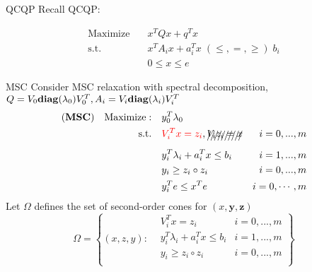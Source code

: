 

\usepackage{subfig}
\usepackage[style=authoryear]{biblatex}
\usepackage{bm}

\date{\today}




\fontsize{9pt}{11}\selectfont
\frame{\titlepage}
\begin{frame}{QCQP}
  Recall QCQP:

  \begin{equation}
    \begin{aligned}
      \mathrm{Maximize}\quad & x^TQx + q^T x                                   \\
      \mathrm{s.t.}  \quad   & x^{T} A_i x  + a_i^Tx   \; (\le, =, \ge) \; b_i \\
                             & 0\le x\le e
    \end{aligned}
  \end{equation}
\end{frame}
\begin{frame}{MSC}
  Consider MSC relaxation with spectral decomposition, \(Q =V_0 \mathbf{diag} (\lambda_0) V_0^T, A_i = V_i \mathbf{diag} (\lambda_i) V_i^T\)
  \begin{equation}\label{eq.rel.msc}
    \begin{aligned}
      \model{MSC} \quad \mathrm{Maximize: }\quad & y_0 ^T\lambda_0                                                       \\
      \mathrm{s.t.} \quad                        & \textcolor{red}{ V_i^Tx = z_i}, \xout{V_i z_i = x  } & i=0,...,m      \\
                                                 & y_i ^T\lambda_i  + a_i^Tx  \le b_i                   & i=1,...,m      \\
                                                 & y_i \ge z_i \circ z_i                                & i=0,...,m      \\
                                                 & y_i^Te \le x^Te                                      & i=0, \cdots, m
    \end{aligned}
  \end{equation}
  Let \(\Omega\) defines the set of second-order cones for \((x, \bm y, \bm z)\)
  \begin{equation}
    \Omega = \left\{ (x,z,y) :  \begin{aligned}
       & V_i^Tx = z_i                       & i=0,...,m \\
       & y_i ^T\lambda_i  + a_i^Tx  \le b_i & i=1,...,m \\
       & y_i \ge z_i \circ z_i              & i=0,...,m \\
    \end{aligned}\right\}
  \end{equation}
\end{frame}
